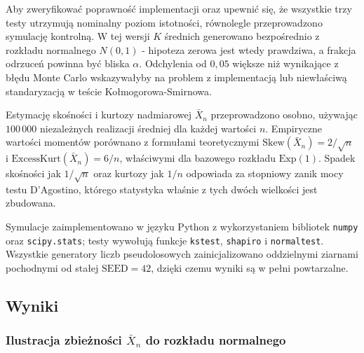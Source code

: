 \documentclass[12pt,a4paper]{article}
\begin{document}
Aby zweryfikować poprawność implementacji oraz upewnić się, że wszystkie trzy testy utrzymują nominalny poziom istotności, równolegle przeprowadzono symulację kontrolną. W tej wersji $K$ średnich generowano bezpośrednio z rozkładu normalnego $N(0, 1)$ - hipoteza zerowa jest wtedy prawdziwa, a frakcja odrzuceń powinna być bliska $\alpha$. Odchylenia od $0{,}05$ większe niż wynikające z błędu Monte Carlo wskazywałyby na problem z implementacją lub niewłaściwą standaryzacją w teście Kołmogorowa-Smirnowa.

Estymację skośności i kurtozy nadmiarowej $\bar{X}_n$ przeprowadzono osobno, używając $100\,000$ niezależnych realizacji średniej dla każdej wartości $n$. Empiryczne wartości momentów porównano z formułami teoretycznymi $\mathrm{Skew}(\bar{X}_n) = 2/\sqrt{n}$ i $\mathrm{ExcessKurt}(\bar{X}_n) = 6/n$, właściwymi dla bazowego rozkładu $\mathrm{Exp}(1)$. Spadek skośności jak $1/\sqrt{n}$ oraz kurtozy jak $1/n$ odpowiada za stopniowy zanik mocy testu D'Agostino, którego statystyka właśnie z tych dwóch wielkości jest zbudowana.

Symulacje zaimplementowano w języku Python z wykorzystaniem bibliotek \texttt{numpy} oraz \texttt{scipy.stats}; testy wywołują funkcje \texttt{kstest}, \texttt{shapiro} i \texttt{normaltest}. Wszystkie generatory liczb pseudolosowych zainicjalizowano oddzielnymi ziarnami pochodnymi od stałej $\mathrm{SEED} = 42$, dzięki czemu wyniki są w pełni powtarzalne.

\subsection{Wyniki}

\subsubsection{Ilustracja zbieżności $\bar{X}_n$ do rozkładu normalnego}
\end{document}
